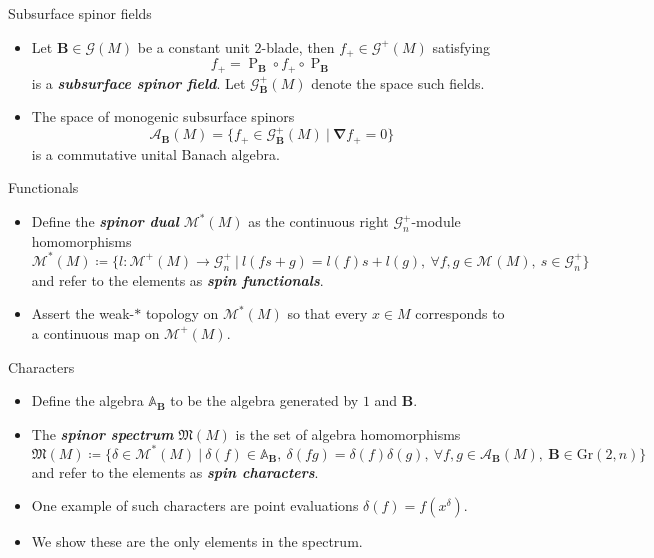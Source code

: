 \documentclass[aspectratio=169]{beamer}
\newcommand\boldgreen[1]{\textcolor{lighter_csu_green}{\emph{\textbf{#1}}}}
\newcommand{\algebra}{\mathcal{A}}
\newcommand{\grad}{\boldsymbol{\nabla}}
\newcommand{\G}{\mathcal{G}}
\newcommand{\characters}{\mathfrak{M}}
\newcommand{\monogenics}{\mathcal{M}}
\newcommand{\dualmonogenics}{\mathcal{M}^*}
\newcommand{\Grassmannian}[2]{\textrm{Gr}(#1,#2)}
\newcommand{\projection}{\operatorname{P}}
\newcommand{\blade}[1]{\boldsymbol{#1}}
\newcommand{\monogenicfields}[1]{\mathcal{M}^{#1}(M)}
\newcommand{\bivector}{\blade{B}}
\begin{document}
\begin{frame}{Subsurface spinor fields}
\vfill
\begin{itemize}
\pause
\item Let $\bivector \in \G(M)$ be a constant unit $2$-blade, then $f_+\in \G^+(M)$ satisfying
\[
f_+ = \projection_{\bivector} \circ f_+ \circ \projection_{\bivector}
\]
is a \boldgreen{subsurface spinor field}. Let $\G_{\bivector}^+(M)$ denote the space such fields.
\pause
\item The space of monogenic subsurface spinors
\[
\algebra_{\bivector}(M) = \{ f_+ \in \G_{\bivector}^+(M) ~\vert~ \grad f_+ = 0 \}
\]
is a commutative unital Banach algebra.
\end{itemize}
\vfill
\end{frame}

\begin{frame}{Functionals}
\vfill
\begin{itemize}
\pause
\item Define the \boldgreen{spinor dual} $\dualmonogenics(M)$ as the continuous right $\G_n^+$-module homomorphisms
\[
\dualmonogenics(M) \coloneqq \{ l \colon \monogenicfields{+} \to \G_n^+ ~\vert~ l(fs+g)=l(f)s+l(g), ~\forall f,g\in \monogenicfields{}, ~s \in \G_n^+\}
\]
and refer to the elements as \boldgreen{spin functionals}. 
\pause
\item Assert the weak-$\ast$ topology on $\dualmonogenics(M)$ so that every $x\in M$ corresponds to a continuous map on $\monogenics^+(M)$.
\end{itemize}
\vfill
\end{frame}

\begin{frame}{Characters}
\vfill
\begin{itemize}
\pause
\item Define the algebra $\mathbb{A}_{\bivector}$ to be the algebra generated by $1$ and $\bivector$. 
\pause
\item The \boldgreen{spinor spectrum} $\characters(M)$ is the set of algebra homomorphisms
\[
\characters(M) \coloneqq \{ \delta \in \dualmonogenics(M) ~\vert~ \delta(f)\in\mathbb{A}_{\bivector},~ \delta(fg) = \delta(f)\delta(g),~\forall f,g \in \algebra_{\bivector}(M),~ \bivector \in \Grassmannian{2}{n} \}
\]
and refer to the elements as \boldgreen{spin characters}. 
\pause
\item One example of such characters are point evaluations $\delta(f)=f(x^\delta)$.
\pause
\item We show these are the only elements in the spectrum.
\end{itemize}
\vfill
\end{frame}
\end{document}
